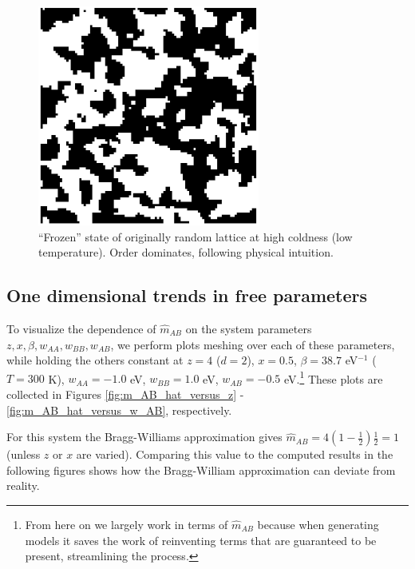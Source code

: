 \documentclass[10pt]{article}
\begin{document}
\begin{figure}[h!]
\centering
\includegraphics[width=0.65\textwidth]{Figures/verification_frozen_lattice.png}
\caption{``Frozen'' state of originally random lattice at high coldness (low temperature).
Order dominates, following physical intuition.}
\label{fig:frozen_lattice}
\end{figure}

\subsection{One dimensional trends in free parameters}
To visualize the dependence of $\hat{m}_{AB}$ on the system parameters $z,x,\beta,w_{AA},w_{BB},w_{AB}$, we perform plots meshing over each of these parameters, while holding the others constant at $z=4$ ($d = 2$), $x = 0.5$, $\beta = 38.7$ eV$^{-1}$ ($T = 300$ K), $w_{AA} = -1.0$ eV, $w_{BB} = 1.0$ eV, $w_{AB} = -0.5$ eV.\footnote{From here on we largely work in terms of $\hat{m}_{AB}$ because when generating models it saves the work of reinventing terms that are guaranteed to be present, streamlining the process.}
These plots are collected in Figures \ref{fig:m_AB_hat_versus_z} - \ref{fig:m_AB_hat_versus_w_AB}, respectively.

For this system the Bragg-Williams approximation gives $\hat{m}_{AB} = 4 \left(1-\frac{1}{2}\right) \frac{1}{2} = 1$ (unless $z$ or $x$ are varied).
Comparing this value to the computed results in the following figures shows how the Bragg-William approximation can deviate from reality.
\end{document}

